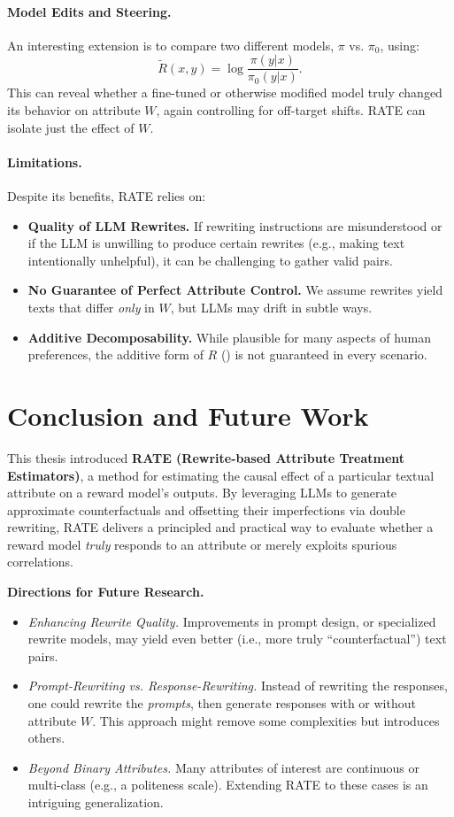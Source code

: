\documentclass{article}
\theoremstyle{definition}
\begin{document}
\paragraph{Model Edits and Steering.}
An interesting extension is to compare two different models, $\pi$ vs. $\pi_0$, using:
\[
\tilde{R}(x,y) = \log\frac{\pi(y|x)}{\pi_0(y|x)}.
\]
This can reveal whether a fine-tuned or otherwise modified model truly changed its behavior on attribute $W$, again controlling for off-target shifts. RATE can isolate just the effect of $W$.

\paragraph{Limitations.}
Despite its benefits, RATE relies on:
\begin{itemize}
    \item \textbf{Quality of LLM Rewrites.} If rewriting instructions are misunderstood or if the LLM is unwilling to produce certain rewrites (e.g., making text intentionally unhelpful), it can be challenging to gather valid pairs.
    \item \textbf{No Guarantee of Perfect Attribute Control.} We assume rewrites yield texts that differ \emph{only} in $W$, but LLMs may drift in subtle ways.
    \item \textbf{Additive Decomposability.} While plausible for many aspects of human preferences, the additive form of $R$ () is not guaranteed in every scenario.
\end{itemize}

\section{Conclusion and Future Work}
\label{sec:conclusion}

This thesis introduced \textbf{RATE (Rewrite-based Attribute Treatment Estimators)}, a method for estimating the causal effect of a particular textual attribute on a reward model’s outputs. By leveraging LLMs to generate approximate counterfactuals and offsetting their imperfections via double rewriting, RATE delivers a principled and practical way to evaluate whether a reward model \emph{truly} responds to an attribute or merely exploits spurious correlations.

\textbf{Directions for Future Research.}
\begin{itemize}
    \item \emph{Enhancing Rewrite Quality.} Improvements in prompt design, or specialized rewrite models, may yield even better (i.e., more truly ``counterfactual'') text pairs.
    \item \emph{Prompt-Rewriting vs. Response-Rewriting.} Instead of rewriting the responses, one could rewrite the \emph{prompts}, then generate responses with or without attribute $W$. This approach might remove some complexities but introduces others.
    \item \emph{Beyond Binary Attributes.} Many attributes of interest are continuous or multi-class (e.g., a politeness scale). Extending RATE to these cases is an intriguing generalization.
\end{itemize}
\end{document}
